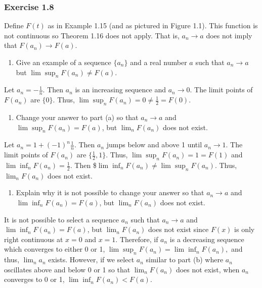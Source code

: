 \documentclass[12pt,]{article}
\providecommand{\tightlist}{%
  \setlength{\itemsep}{0pt}\setlength{\parskip}{0pt}}
\begin{document}
\hypertarget{exercise-1.8}{%
\subsubsection{Exercise 1.8}\label{exercise-1.8}}

Define \(F(t)\) as in Example 1.15 (and as pictured in Figure 1.1). This
function is not continuous so Theorem 1.16 does not apply. That is,
\(a_n \rightarrow a\) does not imply that \(F(a_n) \rightarrow F(a)\).

\begin{enumerate}
\def\labelenumi{\alph{enumi}.}
\tightlist
\item
  Give an example of a sequence \(\{a_n\}\) and a real number \(a\) such
  that \(a_n \rightarrow a\) but \(\lim\sup_n F(a_n) \ne F(a)\).
\end{enumerate}

Let \(a_n = -\frac{1}{n}.\) Then \(a_n\) is an increasing sequence and
\(a_n \rightarrow 0.\) The limit points of \(F(a_n)\) are \(\{0\}.\)
Thus, \(\lim\sup_n F(a_n) = 0 \ne \frac{1}{2} = F(0).\)

\begin{enumerate}
\def\labelenumi{\alph{enumi}.}
\setcounter{enumi}{1}
\tightlist
\item
  Change your answer to part (a) so that \(a_n \rightarrow a\) and
  \(\lim\sup_n F(a_n) = F(a)\), but \(\lim_n F(a_n)\) does not exist.
\end{enumerate}

Let \(a_n = 1+(-1)^n\frac{1}{n}.\) Then \(a_n\) jumps below and above 1
until \(a_n \rightarrow 1.\) The limit points of \(F(a_n)\) are
\(\{\frac{1}{2}, 1\}.\) Thus, \(\lim\sup_n F(a_n) = 1 = F(1)\) and
\(\lim\inf_n F(a_n) = \frac{1}{2}.\) Then
\$\(\lim\inf_n F(a_n) \ne \lim\sup_n F(a_n)\). Thus, \(\lim_n F(a_n)\)
does not exist.

\begin{enumerate}
\def\labelenumi{\alph{enumi}.}
\setcounter{enumi}{2}
\tightlist
\item
  Explain why it is not possible to change your answer so that
  \(a_n \rightarrow a\) and \(\lim\inf_n F(a_n) = F(a)\), but
  \(\lim_n F(a_n)\) does not exist.
\end{enumerate}

It is not possible to select a sequence \(a_n\) such that
\(a_n \rightarrow a\) and \(\lim\inf_n F(a_n) = F(a)\), but
\(\lim_n F(a_n)\) does not exist since \(F(x)\) is only right continuous
at \(x=0\) and \(x = 1.\) Therefore, if \(a_n\) is a decreasing sequence
which converges to either 0 or 1,
\(\lim\sup_n F(a_n) = \lim\inf_n F(a_n),\) and thus, \(\lim_n a_n\)
exists. However, if we select \(a_n\) similar to part (b) where \(a_n\)
oscillates above and below 0 or 1 so that \(\lim_n F(a_n)\) does not
exist, when \(a_n\) converges to 0 or 1, \(\lim\inf_n F(a_n) < F(a).\)
\end{document}
